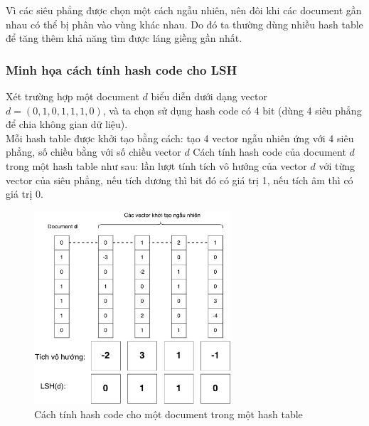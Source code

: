 	Vì các siêu phẳng được chọn một cách ngẫu nhiên, nên đôi khi các document gần nhau có thể bị phân vào vùng khác nhau. Do đó ta thường dùng nhiều hash table để tăng thêm khả năng tìm được láng giềng gần nhất.	
	
	\subsubsection{Minh họa cách tính hash code cho LSH}
	Xét trường hợp một document $d$ biểu diễn dưới dạng vector $d = (0,1,0,1,1,1,0)$, và ta chọn sử dụng hash code có 4 bit (dùng 4 siêu phẳng để chia không gian dữ liệu).\\
	Mỗi hash table được khởi tạo bằng cách: tạo 4 vector ngẫu nhiên ứng với 4 siêu phẳng, số chiều bằng với số chiều vector $d$
	Cách tính hash code của document $d$ trong một hash table như sau: lần lượt tính tích vô hướng của vector $d$ với từng vector của siêu phẳng, nếu tích dương thì bit đó có giá trị 1, nếu tích âm thì có giá trị 0. 
	
	\begin{figure}[ht]
		\begin{center}
			\includegraphics[width=0.65\textwidth]{LSH.pdf}
			\caption{Cách tính hash code cho một document trong một hash table}
		\end{center}
	\end{figure}
	
